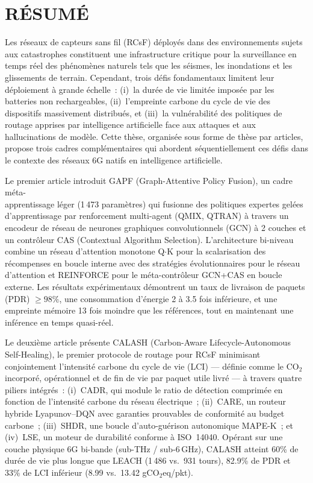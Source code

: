 %
\chapter*{RÉSUMÉ}\thispagestyle{headings}

Les réseaux de capteurs sans fil (RCsF) déployés dans des environnements sujets aux catastrophes constituent une infrastructure critique pour la surveillance en temps réel des phénomènes naturels tels que les séismes, les inondations et les glissements de terrain. Cependant, trois défis fondamentaux limitent leur déploiement à grande échelle~: (i)~la durée de vie limitée imposée par les batteries non rechargeables, (ii)~l'empreinte carbone du cycle de vie des dispositifs massivement distribués, et (iii)~la vulnérabilité des politiques de routage apprises par intelligence artificielle face aux attaques et aux hallucinations de modèle. Cette thèse, organisée sous forme de thèse par articles, propose trois cadres complémentaires qui abordent séquentiellement ces défis dans le contexte des réseaux 6G natifs en intelligence artificielle.

Le premier article introduit GAPF (Graph-Attentive Policy Fusion), un cadre méta-\\apprentissage léger (1\,473 paramètres) qui fusionne des politiques expertes gelées d'apprentissage par renforcement multi-agent (QMIX, QTRAN) à travers un encodeur de réseau de neurones graphiques convolutionnels (GCN) à 2 couches et un contrôleur CAS (Contextual Algorithm Selection). L'architecture bi-niveau combine un réseau d'attention monotone Q$\cdot$K pour la scalarisation des récompenses en boucle interne avec des stratégies évolutionnaires pour le réseau d'attention et REINFORCE pour le méta-contrôleur GCN+CAS en boucle externe. Les résultats expérimentaux démontrent un taux de livraison de paquets (PDR) $\geq 98\%$, une consommation d'énergie 2 à 3.5 fois inférieure, et une empreinte mémoire 13 fois moindre que les références, tout en maintenant une inférence en temps quasi-réel.

Le deuxième article présente CALASH (Carbon-Aware Lifecycle-Autonomous Self-Healing), le premier protocole de routage pour RCsF minimisant conjointement l'intensité carbone du cycle de vie (LCI) --- définie comme le CO$_2$ incorporé, opérationnel et de fin de vie par paquet utile livré --- à travers quatre piliers intégrés~: (i)~CADR, qui module le ratio de détection comprimée en fonction de l'intensité carbone du réseau électrique~; (ii)~CARE, un routeur hybride Lyapunov--DQN avec garanties prouvables de conformité au budget carbone~; (iii)~SHDR, une boucle d'auto-guérison autonomique MAPE-K~; et (iv)~LSE, un moteur de durabilité conforme à ISO~14040. Opérant sur une couche physique 6G bi-bande (sub-THz / sub-6\,GHz), CALASH atteint 60\% de durée de vie plus longue que LEACH (1\,486 vs.\ 931 tours), 82.9\% de PDR et 33\% de LCI inférieur (8.99 vs.\ 13.42 gCO$_2$eq/pkt).

